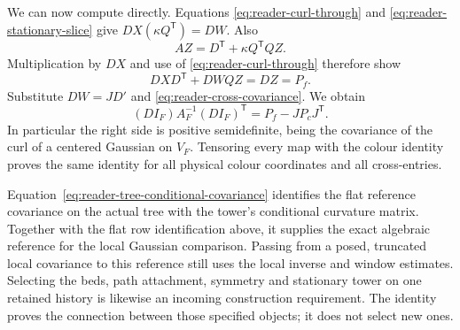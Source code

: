 We can now compute directly. Equations
\eqref{eq:reader-curl-through} and \eqref{eq:reader-stationary-slice}
give $DX(\kappa Q^{\mathsf T})=DW$. Also
\[
 AZ=D^{\mathsf T}+\kappa Q^{\mathsf T}QZ.
\]
Multiplication by $DX$ and use of \eqref{eq:reader-curl-through}
therefore show
\[
 DXD^{\mathsf T}+DWQZ=DZ=P_f.
\]
Substitute $DW=JD'$ and
\eqref{eq:reader-cross-covariance}. We obtain
\begin{equation}\label{eq:reader-tree-conditional-covariance}
 (DI_F)A_F^{-1}(DI_F)^{\mathsf T}
       =P_f-JP_cJ^{\mathsf T}.
\end{equation}
In particular the right side is positive semidefinite, being the
covariance of the curl of a centered Gaussian on $V_F$.
Tensoring every map with the colour identity proves the same
identity for all physical colour coordinates and all cross-entries.

Equation~\eqref{eq:reader-tree-conditional-covariance} identifies the
flat reference covariance on the actual tree with the tower's
conditional curvature matrix. Together with the flat row
identification above, it supplies the exact algebraic reference
for the local Gaussian comparison. Passing from a posed, truncated
local covariance to this reference still uses the local inverse and
window estimates. Selecting the beds, path attachment, symmetry and
stationary tower on one retained history is likewise an incoming
construction requirement. The identity proves the connection between
those specified objects; it does not select new ones.
